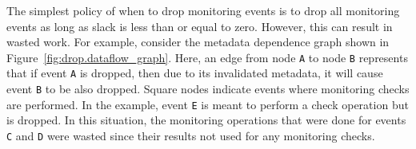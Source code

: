 The simplest policy of when to drop monitoring events is to drop all monitoring events as
long as slack is less than or equal to zero.  However, this can result in
wasted work. For example, consider the metadata dependence graph shown in
Figure~\ref{fig:drop.dataflow_graph}. Here, an edge from node {\tt A} to node
{\tt B} represents that if event {\tt A} is dropped, then due to its
invalidated metadata, it will cause event {\tt B} to be also dropped. Square
nodes indicate events where monitoring checks are performed. In the
example, event {\tt E} is meant to perform a check operation but is dropped.
In this situation, the
monitoring operations that were done for events {\tt C} and {\tt D} were wasted
since their results not used for any monitoring checks.

\begin{figure}
  \begin{center}
\end{center}
\end{figure}
